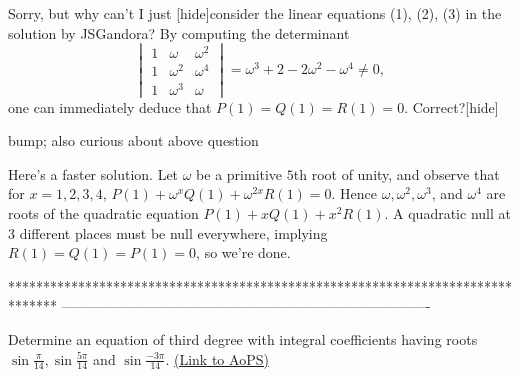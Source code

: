 \begin{solution}
	Sorry, but why can't I just
[hide]consider the linear equations (1), (2), (3)  in the solution by JSGandora? By computing the determinant \[\begin{vmatrix}1&\omega&\omega^2\\1&\omega^2&\omega^4\\1&\omega^3&\omega\end{vmatrix}=\omega^3+2-2\omega^2-\omega^4\neq0,\] one can immediately deduce that $P(1)=Q(1)=R(1)=0$. Correct?[\/hide]
\end{solution}



\begin{solution}
	bump; also curious about above question
\end{solution}



\begin{solution}
	Here's a faster solution. Let $\omega$ be a primitive $5$th root of unity, and observe that for $x = 1, 2, 3, 4$, $P(1)+\omega^xQ(1)+\omega^{2x}R(1) = 0$. Hence $\omega, \omega^2, \omega^3$, and $\omega^4$ are roots of the quadratic equation $P(1)+xQ(1)+x^2R(1)$. A quadratic null at 3 different places must be null everywhere, implying $R(1)=Q(1)=P(1)=0$, so we're done.
\end{solution}
*******************************************************************************
-------------------------------------------------------------------------------

\begin{problem}
	Determine an equation of third degree with integral coefficients having roots $\sin \frac{\pi}{14}, \sin \frac{5 \pi}{14}$ and $\sin \frac{-3 \pi}{14}.$
	\flushright \href{https://artofproblemsolving.com/community/c6h384794}{(Link to AoPS)}
\end{problem}



